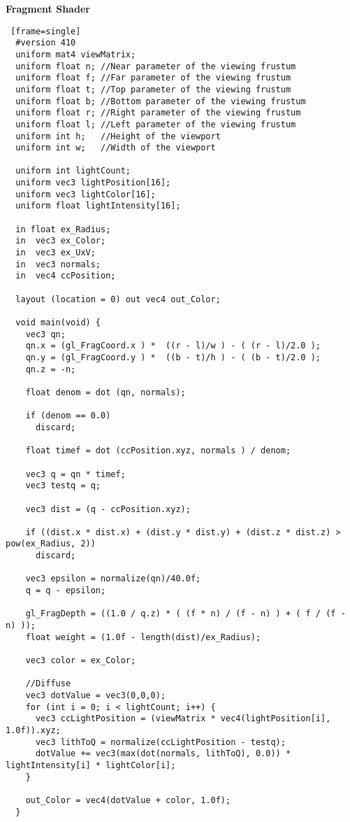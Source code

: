 \textbf{Fragment Shader}
\begin{lstlisting} [frame=single]
  #version 410
  uniform mat4 viewMatrix;
  uniform float n; //Near parameter of the viewing frustum
  uniform float f; //Far parameter of the viewing frustum
  uniform float t; //Top parameter of the viewing frustum
  uniform float b; //Bottom parameter of the viewing frustum
  uniform float r; //Right parameter of the viewing frustum
  uniform float l; //Left parameter of the viewing frustum
  uniform int h;   //Height of the viewport
  uniform int w;   //Width of the viewport

  uniform int lightCount;
  uniform vec3 lightPosition[16];
  uniform vec3 lightColor[16];
  uniform float lightIntensity[16];

  in float ex_Radius;
  in  vec3 ex_Color;
  in  vec3 ex_UxV;
  in  vec3 normals;
  in  vec4 ccPosition;

  layout (location = 0) out vec4 out_Color;

  void main(void) {
    vec3 qn;
    qn.x = (gl_FragCoord.x ) *  ((r - l)/w ) - ( (r - l)/2.0 );
    qn.y = (gl_FragCoord.y ) *  ((b - t)/h ) - ( (b - t)/2.0 );
    qn.z = -n;

    float denom = dot (qn, normals);

    if (denom == 0.0)
      discard;

    float timef = dot (ccPosition.xyz, normals ) / denom;

    vec3 q = qn * timef;
    vec3 testq = q;

    vec3 dist = (q - ccPosition.xyz);

    if ((dist.x * dist.x) + (dist.y * dist.y) + (dist.z * dist.z) > pow(ex_Radius, 2))
      discard;

    vec3 epsilon = normalize(qn)/40.0f;
    q = q - epsilon;

    gl_FragDepth = ((1.0 / q.z) * ( (f * n) / (f - n) ) + ( f / (f - n) ));
    float weight = (1.0f - length(dist)/ex_Radius);

    vec3 color = ex_Color;

    //Diffuse
    vec3 dotValue = vec3(0,0,0);
    for (int i = 0; i < lightCount; i++) {
      vec3 ccLightPosition = (viewMatrix * vec4(lightPosition[i], 1.0f)).xyz;
      vec3 lithToQ = normalize(ccLightPosition - testq);
      dotValue += vec3(max(dot(normals, lithToQ), 0.0)) * lightIntensity[i] * lightColor[i];
    }

    out_Color = vec4(dotValue + color, 1.0f);
  }
\end{lstlisting}
\newpage

